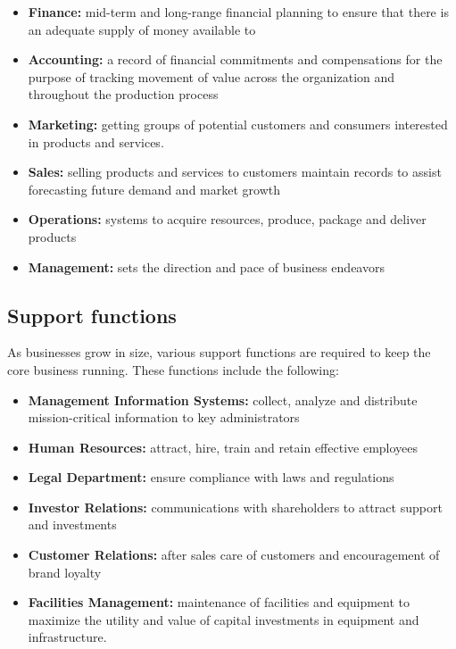 \documentclass[]{book}
\providecommand{\tightlist}{%
  \setlength{\itemsep}{0pt}\setlength{\parskip}{0pt}}
\begin{document}
\begin{itemize}
\tightlist
\item
  \textbf{Finance:} mid-term and long-range financial planning to ensure that there is an adequate supply of money available to
\item
  \textbf{Accounting:} a record of financial commitments and compensations for the purpose of tracking movement of value across the organization and throughout the production process
\item
  \textbf{Marketing:} getting groups of potential customers and consumers interested in products and services.
\item
  \textbf{Sales:} selling products and services to customers maintain records to assist forecasting future demand and market growth
\item
  \textbf{Operations:} systems to acquire resources, produce, package and deliver products
\item
  \textbf{Management:} sets the direction and pace of business endeavors
\end{itemize}

\hypertarget{support-functions}{%
\subsection{Support functions}\label{support-functions}}

As businesses grow in size, various support functions are required to keep the core business running. These functions include the following:

\begin{itemize}
\tightlist
\item
  \textbf{Management Information Systems:} collect, analyze and distribute mission-critical information to key administrators
\item
  \textbf{Human Resources:} attract, hire, train and retain effective employees
\item
  \textbf{Legal Department:} ensure compliance with laws and regulations
\item
  \textbf{Investor Relations:} communications with shareholders to attract support and investments
\item
  \textbf{Customer Relations:} after sales care of customers and encouragement of brand loyalty
\item
  \textbf{Facilities Management:} maintenance of facilities and equipment to maximize the utility and value of capital investments in equipment and infrastructure.
\end{itemize}
\end{document}
